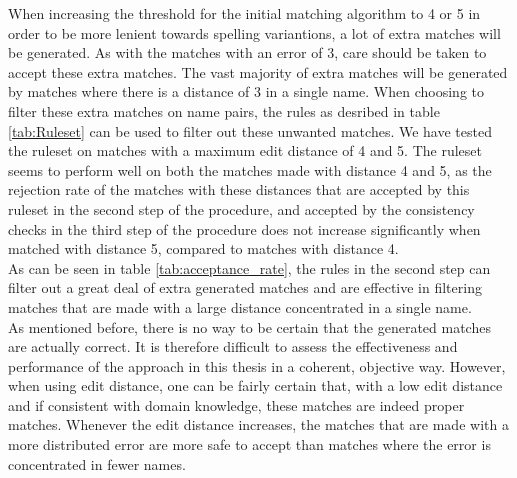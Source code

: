 When increasing the threshold for the initial matching algorithm to 4 or 5 in order to be more lenient towards spelling variantions, a lot of extra matches will be generated. As with the matches with an error of 3, care should be taken to accept these extra matches. The vast majority of extra matches will be generated by matches where there is a distance of 3 in a single name. 
When choosing to filter these extra matches on name pairs, the rules as desribed in table \ref{tab:Ruleset} can be used to filter out these unwanted matches. We have tested the ruleset on matches with a maximum edit distance of 4 and 5. The ruleset seems to perform well on both the matches made with distance 4 and 5, as the rejection rate of the matches with these distances that are accepted by this ruleset in the second step of the procedure, and accepted by the consistency checks in the third step of the procedure does not increase significantly when matched with distance 5, compared to matches with distance 4.\\

As can be seen in table \ref{tab:acceptance_rate}, the rules in the second step can filter out a great deal of extra generated matches and are effective in filtering matches that are made with a large distance concentrated in a single name.\\

As mentioned before, there is no way to be certain that the generated matches are actually correct. It is therefore difficult to assess the effectiveness and performance of the approach in this thesis in a coherent, objective way. However, when using edit distance, one can be fairly certain that, with a low edit distance and if consistent with domain knowledge, these matches are indeed proper matches. Whenever the edit distance increases, the matches that are made with a more distributed error are more safe to accept than matches where the error is concentrated in fewer names.